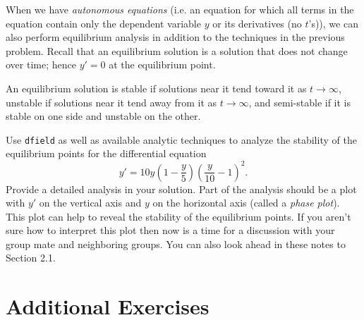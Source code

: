     When we have {\it autonomous equations} (i.e. an equation for which all terms in
        the equation contain only the dependent variable $y$ or its derivatives (no
        $t$'s)), we can also perform equilibrium analysis in addition to the techniques in
        the previous problem. Recall that an equilibrium solution is a solution that does
        not change over time; hence $y'=0$ at the equilibrium point. 
        
        An equilibrium solution is stable if solutions near it tend toward it as
        $t\to\infty$, unstable if solutions near it tend away from it as $t\to\infty$, and
        semi-stable if it is stable on one side and unstable on the other.

        \begin{problem}
            Use \texttt{dfield} as well as available analytic techniques to analyze the
            stability of the equilibrium points for the differential equation
            \[ y' = 10 y \left( 1-\frac{y}{5} \right) \left( \frac{y}{10}-1 \right)^2. \]
            Provide a detailed analysis in your solution.  Part of the analysis should be
            a plot with $y'$ on the vertical axis and $y$ on the horizontal axis (called a
            {\it phase plot}).  This plot can help to reveal the stability of the
            equilibrium points.  If you aren't sure how to interpret this plot then now is
            a time for a discussion with your group mate and neighboring groups.  You can
            also look ahead in these notes to Section 2.1.
        \end{problem}

% 



\newpage\section{Additional Exercises}

